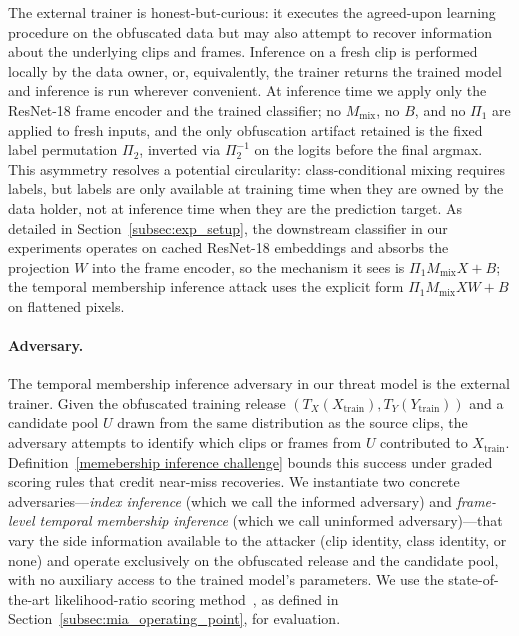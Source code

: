 \documentclass[sigconf,anonymous, review]{acmart}
\begin{document}
The external trainer is honest-but-curious: it executes the agreed-upon learning procedure on the obfuscated data but may also attempt to recover information about the underlying clips and frames. Inference on a fresh clip is performed locally by the data owner, or, equivalently, the trainer returns the trained model and inference is run wherever convenient. At inference time we apply only the ResNet-18 frame encoder and the trained classifier; no $M_{\mathrm{mix}}$, no $B$, and no $\Pi_1$ are applied to fresh inputs, and the only obfuscation artifact retained is the fixed label permutation $\Pi_2$, inverted via $\Pi_2^{-1}$ on the logits before the final argmax. This asymmetry resolves a potential circularity: class-conditional mixing requires labels, but labels are only available at training time when they are owned by the data holder, not at inference time when they are the prediction target. As detailed in Section~\ref{subsec:exp_setup}, the downstream classifier in our experiments operates on cached ResNet-18 embeddings and absorbs the projection $W$ into the frame encoder, so the mechanism it sees is $\Pi_1 M_{\mathrm{mix}} X + B$; the temporal membership inference attack uses the explicit form $\Pi_1 M_{\mathrm{mix}} X W + B$ on flattened pixels.

\paragraph{Adversary.}
The temporal membership inference adversary in our threat model is the external trainer. Given the obfuscated training release $(T_X(X_{\mathrm{train}}), T_Y(Y_{\mathrm{train}}))$ and a candidate pool $U$ drawn from the same distribution as the source clips, the adversary attempts to identify which clips or frames from $U$ contributed to $X_{\mathrm{train}}$. Definition~\ref{memebership inference challenge} bounds this success under graded scoring rules that credit near-miss recoveries. We instantiate two concrete adversaries---\emph{index inference} (which we call the informed adversary) and \emph{frame-level temporal membership inference} (which we call uninformed adversary)---that vary the side information available to the attacker (clip identity, class identity, or none) and operate exclusively on the obfuscated release and the candidate pool, with no auxiliary access to the trained model's parameters. We use the state-of-the-art likelihood-ratio scoring method~\cite{carlini2022firstprinciples}, as defined in Section~\ref{subsec:mia_operating_point}, for evaluation.
\end{document}
